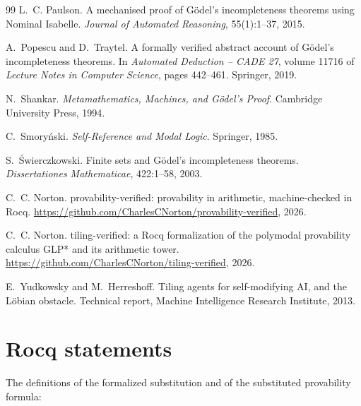 \documentclass[11pt]{article}
\theoremstyle{plain}
\theoremstyle{definition}
\theoremstyle{remark}
\begin{document}
\begin{thebibliography}{99}
L.~C. Paulson.
\newblock A mechanised proof of {G}{\"o}del's incompleteness theorems using
  {N}ominal {I}sabelle.
\newblock \emph{Journal of Automated Reasoning}, 55(1):1--37, 2015.

A.~Popescu and D.~Traytel.
\newblock A formally verified abstract account of {G}{\"o}del's
  incompleteness theorems.
\newblock In \emph{Automated Deduction -- CADE 27}, volume 11716 of
  \emph{Lecture Notes in Computer Science}, pages 442--461. Springer, 2019.

N.~Shankar.
\newblock \emph{Metamathematics, Machines, and {G}{\"o}del's Proof}.
\newblock Cambridge University Press, 1994.

C.~Smory{\'n}ski.
\newblock \emph{Self-Reference and Modal Logic}.
\newblock Springer, 1985.

S.~{\'S}wierczkowski.
\newblock Finite sets and {G}{\"o}del's incompleteness theorems.
\newblock \emph{Dissertationes Mathematicae}, 422:1--58, 2003.

C.~C. Norton.
\newblock provability-verified: provability in arithmetic, machine-checked in
  {R}ocq.
\newblock \url{https://github.com/CharlesCNorton/provability-verified}, 2026.

C.~C. Norton.
\newblock tiling-verified: a {R}ocq formalization of the polymodal
  provability calculus {GLP*} and its arithmetic tower.
\newblock \url{https://github.com/CharlesCNorton/tiling-verified}, 2026.

E.~Yudkowsky and M.~Herreshoff.
\newblock Tiling agents for self-modifying {AI}, and the {L}{\"o}bian
  obstacle.
\newblock Technical report, Machine Intelligence Research Institute, 2013.

\end{thebibliography}

\appendix

\section{Rocq statements}\label{app:statements}

The definitions of the formalized substitution and of the substituted
provability formula:
\end{document}
